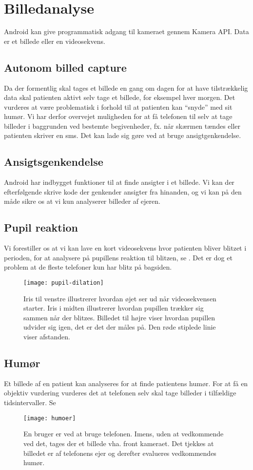 \section{Billedanalyse}
Android kan give programmatisk adgang til kameraet gennem Kamera API. Data er et billede eller en videosekvens.


\subsection{Autonom billed capture}
Da der formentlig skal tages et billede en gang om dagen for at have tilstrækkelig data skal patienten aktivt selv tage et billede, for eksempel hver morgen.
Det vurderes at være problematisk i forhold til at patienten kan ``snyde'' med sit humør.
Vi har derfor overvejet muligheden for at få telefonen til selv at tage billeder i baggrunden ved bestemte begivenheder, fx. når skærmen tændes eller patienten skriver en sms.
Det kan lade sig gøre ved at bruge ansigtgenkendelse.

\subsection{Ansigtsgenkendelse}
Android har indbygget funktioner til at finde ansigter i et billede. 
Vi kan der efterfølgende skrive kode der genkender ansigter fra hinanden, og vi kan på den måde sikre os at vi kun analyserer billeder af ejeren.%

\subsection{Pupil reaktion}
Vi forestiller os at vi kan lave en kort videosekvens hvor patienten bliver blitzet i perioden, for at analysere på pupillens reaktion til blitzen, se \cite{hoeks1993pupillary}.
Det er dog et problem at de fleste telefoner kun har blitz på bagsiden.
\begin{figure}
	\centering
\texttt{[image: pupil-dilation]}
\caption{Iris til venstre illustrerer hvordan øjet ser ud når videosekvensen starter. Iris i midten illustrerer hvordan pupillen trækker sig sammen når der blitzes. Billedet til højre viser hvordan pupillen udvider sig igen, det er det der måles på. Den røde stiplede linie viser afstanden.}
\end{figure}

\subsection{Humør}

Et billede af en patient kan analyseres for at finde patientens humør. 
For at få en objektiv vurdering vurderes det at telefonen selv skal tage billeder i tilfældige tidsintervaller. 
Se \cite{kulkarni2009facial}
\begin{figure}
	\centering
\texttt{[image: humoer]}
\caption{En bruger er ved at bruge telefonen. Imens, uden at vedkommende ved det, tages der et billede vha. front kameraet. Det tjekkes at billedet er af telefonens ejer og derefter evalueres vedkommendes humør.}
\end{figure}